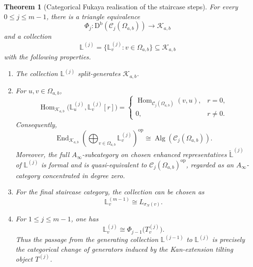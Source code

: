 \documentclass[12pt,a4paper,english,reqno]{amsart}
\theoremstyle{plain}
\newtheorem{theorem}{Theorem}[section]
\theoremstyle{definition}
\newcommand{\Db}{\mathrm D^{\mathrm b}}
\newcommand{\Hom}{\operatorname{Hom}}
\newcommand{\End}{\operatorname{End}}
\newcommand{\op}{\mathrm{op}}
\newcommand{\C}{\mathcal C}
\begin{document}
\begin{theorem}[Categorical Fukaya realisation of the staircase steps]
\label{thm:categorical-fukaya-staircase}
For every $0\leq j\leq m-1$, there is a triangle equivalence
\begin{equation}
 \Phi_j\colon
 \Db(\C_j(\Omega_{a,b}))
 \longrightarrow
 \mathcal K_{a,b}
\label{eq:Phi-j}
\end{equation}
and a collection
\begin{equation}
 \mathbb L^{(j)}
 =
 \{\mathbb L_v^{(j)}:v\in\Omega_{a,b}\}
 \subseteq\mathcal K_{a,b}
\label{eq:L-j-collection}
\end{equation}
with the following properties.
\begin{enumerate}
\item The collection $\mathbb L^{(j)}$ split-generates
$\mathcal K_{a,b}$.
\item For $u,v\in\Omega_{a,b}$,
\begin{equation}
 \Hom_{\mathcal K_{a,b}}
 \bigl(\mathbb L_u^{(j)},\mathbb L_v^{(j)}[r]\bigr)
 =
 \begin{cases}
  \Hom_{\C_j(\Omega_{a,b})}(v,u),&r=0,\\
  0,&r\neq0.
 \end{cases}
\label{eq:L-j-Hom}
\end{equation}
Consequently,
\begin{equation}
 \End_{\mathcal K_{a,b}}
 \left(
  \bigoplus_{v\in\Omega_{a,b}}\mathbb L_v^{(j)}
 \right)^{\op}
 \cong
 \operatorname{Alg}\!\left(\C_j(\Omega_{a,b})\right).
\label{eq:L-j-end}
\end{equation}
Moreover, the full $A_\infty$-subcategory on chosen enhanced representatives
$\widetilde{\mathbb L}^{(j)}$ of $\mathbb L^{(j)}$ is formal and is
quasi-equivalent to
$\C_j(\Omega_{a,b})^{\op}$, regarded as an $A_\infty$-category
concentrated in degree zero.
\item For the final staircase category, the collection can be chosen as
\begin{equation}
 \mathbb L_v^{(m-1)}
 \cong
 L_{\sigma_N(v)}.
\label{eq:final-product-lagrangian}
\end{equation}
\item For $1\leq j\leq m-1$, one has
\begin{equation}
 \mathbb L_v^{(j)}
 \cong
 \Phi_{j-1}\bigl(T_v^{(j)}\bigr).
\label{eq:Kan-Fukaya-image}
\end{equation}
Thus the passage from the generating collection
$\mathbb L^{(j-1)}$ to $\mathbb L^{(j)}$ is precisely the
categorical change of generators induced by the Kan-extension tilting
object $T^{(j)}$.
\end{enumerate}
\end{theorem}
\end{document}

